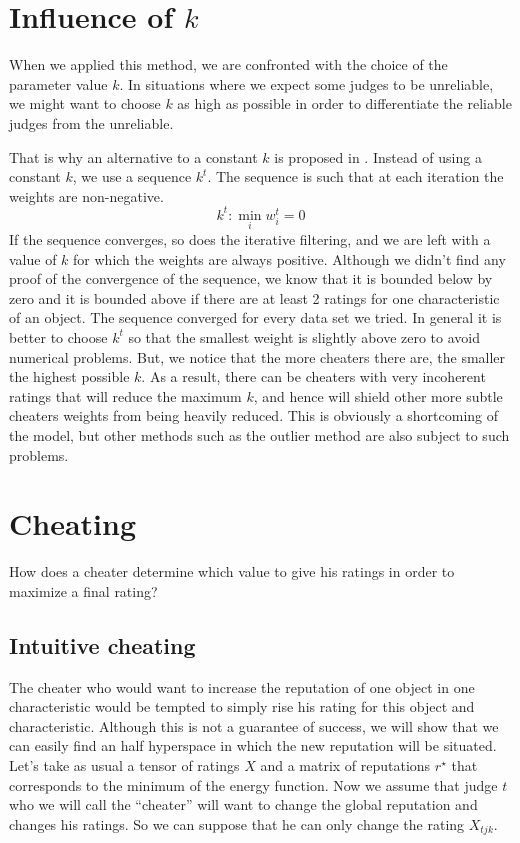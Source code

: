 \documentclass[12pt,a4paper]{article}
\newcommand{\quotes}[1]{``#1''}
\begin{document}
\section{Influence of $k$}
When we applied this method, we are confronted with the choice of the parameter value $k$. In situations where we expect some judges to be unreliable, we might want to choose $k$ as high as possible in order to differentiate the reliable judges from the unreliable.

That is why an alternative to a constant $k$ is proposed in \cite{Cristo1}. Instead of using a constant $k$, we use a sequence $k^t$. The sequence is such that at each iteration the weights are non-negative.
$$ k^t : \min_i w_i^t = 0$$
If the sequence converges, so does the iterative filtering, and we are left with a value of $k$ for which the weights are always positive.
Although we didn't find any proof of the convergence of the sequence, we know that it is bounded below by zero and it is bounded above if there are at least 2 ratings for one characteristic of an object.	The sequence converged for every data set we tried. In general it is better to choose $k^t$ so that the smallest weight is slightly above zero to avoid numerical problems.
But, we notice that the more cheaters there are, the smaller the highest possible $k$. As a result, there can be cheaters with very incoherent ratings that will reduce the maximum $k$, and hence will shield other more subtle cheaters weights from being heavily reduced.
This is obviously a shortcoming of the model, but other methods such as the outlier method are also subject to such problems.

\section{Cheating}
How does a cheater determine which value to give his ratings in order to maximize a final rating? 
\subsection{Intuitive cheating}

The cheater who would want to increase the reputation of one object in one characteristic would be tempted to simply rise his rating for this object and characteristic. Although this is not a guarantee of success, we will show that we can easily find an half hyperspace in which the new reputation will be situated.\\

Let's take as usual a tensor of ratings $X$ and a matrix of reputations $r^{\star}$ that corresponds to the minimum of the energy function. Now we assume that judge $t$ who we will call the \quotes{cheater} will want to change the global reputation and changes his ratings. So we can suppose that he can only change the rating $X_{tjk}$. 
\end{document}
